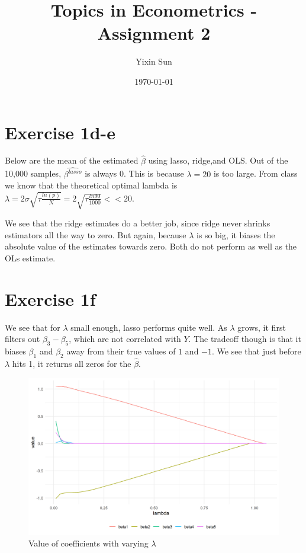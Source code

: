 \documentclass[reqno,12pt,notitlepage]{article}
\title{Topics in Econometrics - Assignment 2}
\author{Yixin Sun}
\date{\today}
\begin{document}
\maketitle
\section*{Exercise 1d-e}
Below are the mean of the estimated $\hat{\beta}$ using lasso, ridge,and OLS. Out of the 10,000 samples, $\hat{\beta{^{lasso}}}$ is always 0. This is because $\lambda = 20$ is too large. From class we know that the theoretical optimal lambda is $\lambda = 2\sigma \sqrt{\tau \frac{ln (p)}{N}} = 2\sqrt{\tau \frac{ln 90}{1000}} << 20$. 

We see that the ridge estimates do a better job, since ridge never shrinks estimators all the way to zero. But again, because $\lambda$ is so big, it biases the absolute value of the estimates towards zero. Both do not perform as well as the OLs estimate.

\begin{table}[H]
    \centering
    
\end{table}

\section*{Exercise 1f}
We see that for $\lambda$ small enough, lasso performs quite well. As $\lambda$ grows, it first filters out $\beta_3 - \beta_5$, which are not correlated with $Y$. The tradeoff though is that it biases $\beta_1$ and $\beta_2$ away from their true values of $1$ and $-1$. We see that just before $\lambda$ hits 1, it returns all zeros for the $\hat{\beta}$. 

\begin{figure}[!h]
    \centering
    \includegraphics[width=.8\textwidth]{beta_lambdas.png}
    \caption{Value of coefficients with varying $\lambda$}
\end{figure}
\end{document}
